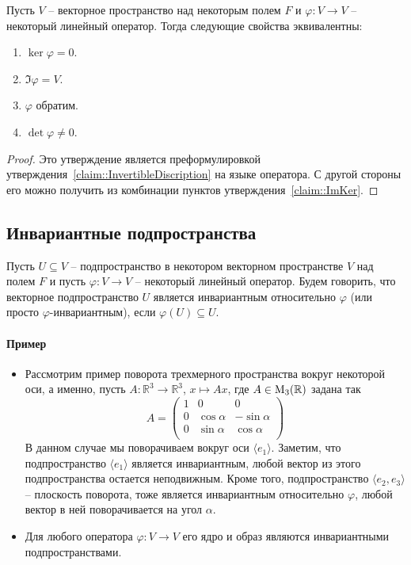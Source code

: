 \begin{claim}
\label{claim::OperatorInvert}
Пусть $V$ -- векторное пространство над некоторым полем $F$ и $\varphi\colon V\to V$ -- некоторый линейный оператор.
Тогда следующие свойства эквивалентны:
\begin{enumerate}
\item $\ker \varphi = 0$.

\item $\Im \varphi = V$.

\item $\varphi$ обратим.

\item $\det \varphi \neq 0$.
\end{enumerate}
\end{claim}
\begin{proof}
Это утверждение является преформулировкой утверждения~\ref{claim::InvertibleDiscription} на языке оператора.
С другой стороны его можно получить из комбинации пунктов утверждения~\ref{claim::ImKer}.
\end{proof}

\subsection{Инвариантные подпространства}

Пусть $U\subseteq V$ -- подпространство в некотором векторном пространстве $V$ над полем $F$ и пусть $\varphi\colon V\to V$ -- некоторый линейный оператор.
Будем говорить, что векторное подпространство $U$ является инвариантным относительно $\varphi$ (или просто $\varphi$-инвариантным), если $\varphi(U)\subseteq U$.

\paragraph{Пример}

\begin{itemize}
\item Рассмотрим пример поворота трехмерного пространства вокруг некоторой оси, а именно, пусть $A\colon \mathbb R^3 \to \mathbb R^3$, $x\mapsto Ax$, где $A\in \operatorname{M}_{3}(\mathbb R)$ задана так
\[
A = 
\begin{pmatrix}
{1}&{0}&{0}\\
{0}&{\cos \alpha}&{-\sin \alpha}\\
{0}&{\sin \alpha}&{\cos \alpha}\\
\end{pmatrix}
\]
В данном случае мы поворачиваем вокруг оси $\langle e_1 \rangle$.
Заметим, что подпространство $\langle e_1\rangle$ является инвариантным, любой вектор из этого подпространства остается неподвижным.
Кроме того, подпространство $\langle e_2, e_3\rangle$ -- плоскость поворота, тоже является инвариантным относительно $\varphi$, любой вектор в ней поворачивается на угол $\alpha$.

\item Для любого оператора $\varphi \colon V\to V$ его ядро и образ являются инвариантными подпространствами.
\end{itemize}

